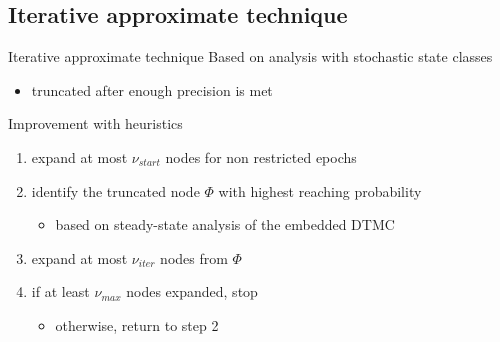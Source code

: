   \subsection{Iterative approximate technique}
    \begin{frame}{Iterative approximate technique}
      Based on analysis with stochastic state classes
      \begin{itemize}
        \item truncated after enough precision is met
      \end{itemize}
      
      \vspace{2em}
      Improvement with heuristics
      \begin{enumerate}
        \item expand at most $\nu_{start}$ nodes for non restricted epochs
        \item identify the truncated node $\Phi$ with highest reaching probability
        \begin{itemize}
          \item based on steady-state analysis of the embedded DTMC
        \end{itemize}
        \item expand at most $\nu_{iter}$ nodes from $\Phi$
        \item if at least $\nu_{max}$ nodes expanded, stop
        \begin{itemize}
          \item otherwise, return to step 2
        \end{itemize}
      \end{enumerate}
    \end{frame}
